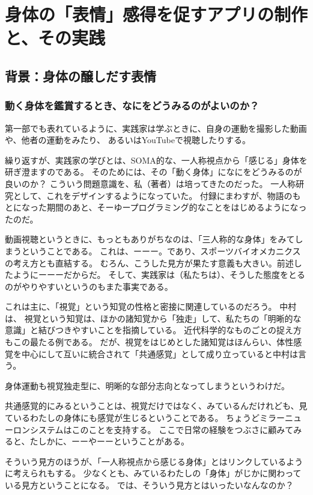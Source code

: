\part{身体の「表情」感得を促すアプリの制作と、その実践}
\setcounter{chapter}{0} %
\chapter{背景：身体の醸しだす表情}

\section{動く身体を鑑賞するとき、なにをどうみるのがよいのか？}
\label{sec:学びにおける、動く身体を鑑賞するという体験}
第一部でも表れているように、実践家は学ぶときに、自身の運動を撮影した動画や、他者の運動をみたり、
あるいはYouTubeで視聴したりする。

繰り返すが、実践家の学びとは、SOMA的な、一人称視点から「感じる」身体を研ぎ澄ますのである。
そのためには、その「動く身体」になにをどうみるのが良いのか？
こういう問題意識を、私（著者）は培ってきたのだった。
一人称研究として、これをデザインするようになっていた。
付録にまわすが、物語のもとになった期間のあと、そーゆープログラミング的なことをはじめるようになったのだ。

動画視聴というときに、もっともありがちなのは、「三人称的な身体」をみてしまうということである。
これは、ーーー。であり、スポーツバイオメカニクスの考え方とも直結する。
むろん、こうした見方が果たす意義も大きい。前述したようにーーーだからだ。
そして、実践家は（私たちは）、そうした態度をとるのがやりやすいというのもまた事実である。

これは主に、「視覚」という知覚の性格と密接に関連しているのだろう。
中村\cite{nakamura:2000}は、
視覚という知覚は、ほかの諸知覚から「独走」して、私たちの「明晰的な意識」と結びつきやすいことを指摘している。
近代科学的なものごとの捉え方もこの最たる例である。
だが、視覚をはじめとした諸知覚はほんらい、体性感覚を中心にして互いに統合されて「共通感覚」として成り立っていると中村は言う。

身体運動も視覚独走型に、明晰的な部分志向となってしまうというわけだ。

共通感覚的にみるということは、視覚だけではなく、みているんだけれども、見ているわたしの身体にも感覚が生じるということである。
ちょうどミラーニューロンシステムはこのことを支持する。
ここで日常の経験をつぶさに顧みてみると、たしかに、ーーやーーということがある。

そういう見方のほうが、「一人称視点から感じる身体」とはリンクしているように考えられもする。
少なくとも、みているわたしの「身体」がじかに関わっている見方ということになる。
では、そういう見方とはいったいなんなのか？


